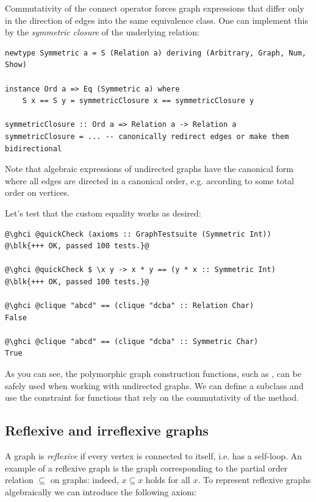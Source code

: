 Commutativity of the connect operator forces graph expressions that differ only
in the direction of edges into the same equivalence class. One can implement
this by the \emph{symmetric closure} of the underlying relation:

\begin{verbatim}
newtype Symmetric a = S (Relation a) deriving (Arbitrary, Graph, Num, Show)

instance Ord a => Eq (Symmetric a) where
    S x == S y = symmetricClosure x == symmetricClosure y

symmetricClosure :: Ord a => Relation a -> Relation a
symmetricClosure = ... -- canonically redirect edges or make them bidirectional
\end{verbatim}

Note that algebraic expressions of undirected graphs have the canonical form where all
edges are directed in a canonical order, e.g. according to some total order on vertices.

Let's test that the custom equality works as desired:
\begin{verbatim}
@\ghci @quickCheck (axioms :: GraphTestsuite (Symmetric Int))
@\blk{+++ OK, passed 100 tests.}@

@\ghci @quickCheck $ \x y -> x * y == (y * x :: Symmetric Int)
@\blk{+++ OK, passed 100 tests.}@

@\ghci @clique "abcd" == (clique "dcba" :: Relation Char)
False

@\ghci @clique "abcd" == (clique "dcba" :: Symmetric Char)
True
\end{verbatim}

As you can see, the polymorphic graph construction functions, such as ,
can be safely used when working with undirected graphs. We can define a subclass
 and use the
constraint for functions that rely on the commutativity of the  method.

\subsection{Reflexive and irreflexive graphs}\label{sub-reflexive}

A graph is \emph{reflexive} if every vertex is connected to itself, i.e. has a self-loop.
An example of a reflexive graph is the graph corresponding to the partial
order relation $\subseteq$ on graphs: indeed, $x \subseteq x$ holds for all $x$. To
represent reflexive graphs algebraically we can introduce the following axiom:

